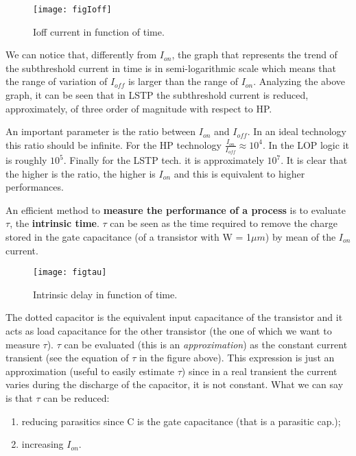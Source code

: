 \documentclass[a4paper, 12pt, twoside, openright]{report}
\begin{document}
	\begin{figure}[h]
	\centering
	\texttt{[image: figIoff]}
	\caption{Ioff current in function of time.}
	\label{}
	\end{figure}

We can notice that, differently from $I_{on}$, the graph that represents the trend of the subthreshold current in time is in semi-logarithmic scale which means that the range of variation of $I_{off}$ is larger than the range of $I_{on}$. Analyzing the above graph, it can be seen that in LSTP the subthreshold current is reduced, approximately, of three order of magnitude with respect to HP.

An important parameter is the ratio between $I_{on}$ and $I_{off}$. In an ideal technology this ratio should be infinite. For the HP technology $\frac{I_{on}}{I_{off}} \approx 10^4$. In the LOP logic it is roughly $10^5$. Finally for the LSTP tech. it is approximately $10^7$. It is clear that the higher is the ratio, the higher is $I_{on}$ and this is equivalent to higher performances.

An efficient method to \textbf{measure the performance of a process} is to evaluate $\tau$, the \textbf{intrinsic time}. $\tau$ can be seen as the time required to remove the charge stored in the gate capacitance (of a transistor with W = 1$\mu m$) by mean of the $I_{on}$ current.

	\begin{figure}[h]
	\centering
	\texttt{[image: figtau]}
	\caption{Intrinsic delay in function of time.}
	\label{tau}
	\end{figure}

The dotted capacitor is the equivalent input capacitance of the transistor and it acts as load capacitance for the other transistor (the one of which we want to measure $\tau$). $\tau$ can be evaluated (this is an \emph{approximation}) as the constant current transient (see the equation of $\tau$ in the figure above). This expression is just an approximation (useful to easily estimate $\tau$) since in a real transient the current varies during the discharge of the capacitor, it is not constant. What we can say is that $\tau$ can be reduced:

	\begin{enumerate}
		\item reducing parasitics since C is the gate capacitance (that is a parasitic cap.);
		\item increasing $I_{on}$.
	\end{enumerate}
\end{document}
